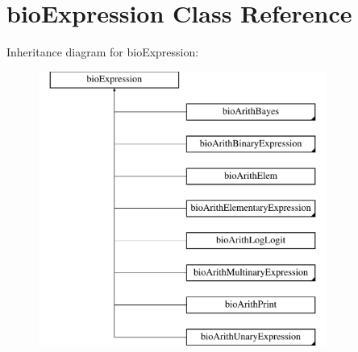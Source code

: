 \hypertarget{classbio_expression}{}\section{bio\+Expression Class Reference}
\label{classbio_expression}
Inheritance diagram for bio\+Expression\+:\begin{figure}[H]
\begin{center}
\leavevmode
\includegraphics[height=9.000000cm]{classbio_expression}
\end{center}
\end{figure}
